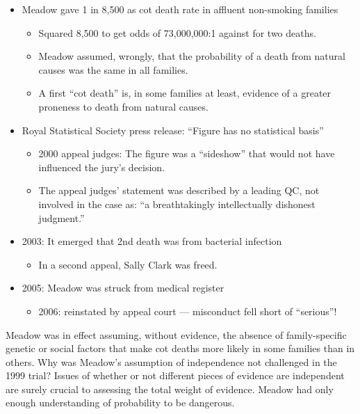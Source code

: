 \documentclass[
  10pt,
  b5paper]{book}
\providecommand{\tightlist}{%
  \setlength{\itemsep}{0pt}\setlength{\parskip}{0pt}}
\begin{document}
\begin{itemize}
\tightlist
\item
  Meadow gave 1 in 8,500 as cot death rate in affluent non-smoking families

  \begin{itemize}
  \tightlist
  \item
    Squared 8,500 to get odds of 73,000,000:1 against for two deaths.
  \item
    Meadow assumed, wrongly, that the probability of a death from
    natural causes was the same in all families.
  \item
    A first ``cot death'' is, in some families at least, evidence of a greater
    proneness to death from natural causes.
  \end{itemize}
\item
  Royal Statistical Society press release: ``Figure has no statistical basis''

  \begin{itemize}
  \tightlist
  \item
    2000 appeal judges: The figure was a
    ``sideshow'' that would not have influenced the jury's decision.
  \item
    The appeal judges' statement was described by a leading QC, not
    involved in the case as: ``a breathtakingly intellectually dishonest
    judgment.''
  \end{itemize}
\item
  2003: It emerged that 2nd death was from bacterial infection

  \begin{itemize}
  \tightlist
  \item
    In a second appeal, Sally Clark was freed.
  \end{itemize}
\item
  2005: Meadow was struck from medical register

  \begin{itemize}
  \tightlist
  \item
    2006: reinstated by appeal court --- misconduct fell short of ``serious''!
  \end{itemize}
\end{itemize}

Meadow was in effect assuming, without evidence, the
absence of family-specific genetic or social factors that
make cot deaths more likely in some families than in others.
Why was Meadow's assumption of independence not challenged
in the 1999 trial? Issues of whether or not different pieces
of evidence are independent are surely crucial to assessing
the total weight of evidence. Meadow had only enough
understanding of probability to be dangerous.
\end{document}
